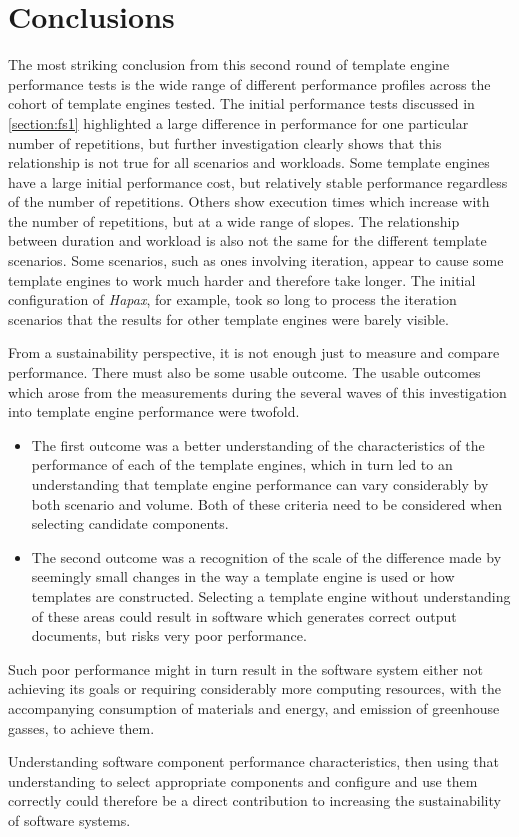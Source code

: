 \section{Conclusions}
\label{comp:conclusions}

The most striking conclusion from this second round of template engine performance tests is the wide range of different performance profiles across the cohort of template engines tested. The initial performance tests discussed in \autoref{section:fs1} highlighted a large difference in performance for one particular number of repetitions, but further investigation clearly shows that this relationship is not true for all scenarios and workloads. Some template engines have a large initial performance cost, but relatively stable performance regardless of the number of repetitions. Others show execution times which increase with the number of repetitions, but at a wide range of slopes. The relationship between duration and workload is also not the same for the different template scenarios. Some scenarios, such as ones involving iteration, appear to cause some template engines to work much harder and therefore take longer. The initial configuration of \emph{Hapax}, for example, took so long to process the iteration scenarios that the results for other template engines were barely visible.

From a sustainability perspective, it is not enough just to measure and compare performance. There must also be some usable outcome. The usable outcomes which arose from the measurements during the several waves of this investigation into template engine performance were twofold.

\begin{itemize}
    \item The first outcome was a better understanding of the characteristics of the performance of each of the template engines, which in turn led to an understanding that template engine performance can vary considerably by both scenario and volume. Both of these criteria need to be considered when selecting candidate components.
    \item The second outcome was a recognition of the scale of the difference made by seemingly small changes in the way a template engine is used or how templates are constructed. Selecting a template engine without understanding of these areas could result in software which generates correct output documents, but risks very poor performance. 
\end{itemize}

Such poor performance might in turn result in the software system either not achieving its goals or requiring considerably more computing resources, with the accompanying consumption of materials and energy, and emission of greenhouse gasses, to achieve them.

Understanding software component performance characteristics, then using that understanding to select appropriate components and configure and use them correctly could therefore be a direct contribution to increasing the sustainability of software systems.
